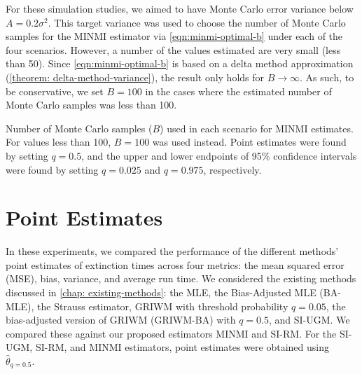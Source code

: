 For these simulation studies, we aimed to have Monte Carlo error variance below $A = 0.2\sigma^2$. This target variance was used to choose the number of Monte Carlo samples for the MINMI estimator via \autoref{eqn:minmi-optimal-b} under each of the four scenarios. However, a number of the values estimated are very small (less than 50). Since \autoref{eqn:minmi-optimal-b} is based on a delta method approximation (\autoref{theorem: delta-method-variance}), the result only holds for $B \rightarrow \infty$. As such, to be conservative, we set $B=100$ in the cases where the estimated number of Monte Carlo samples was less than 100. %
\begin{table}[ht]
    \centering
    \caption{Number of Monte Carlo samples ($B$) used in each scenario for MINMI estimates. For values less than 100, $B = 100$ was used instead. Point estimates were found by setting $q = 0.5$, and the upper and lower endpoints of 95\% confidence intervals were found by setting $q=0.025$ and $q=0.975$, respectively.}
    \vspace{4mm}
    
    \label{tab:table-sim-exp-minmi-Bs}
    \vspace{-4mm}
\end{table}

\section{Point Estimates}

In these experiments, we compared the performance of the different methods' point estimates of extinction times across four metrics: the mean squared error (MSE), bias, variance, and average run time. We considered the existing methods discussed in \autoref{chap: existing-methods}: the MLE, the Bias-Adjusted MLE (BA-MLE), the Strauss estimator, GRIWM with threshold probability $q=0.05$, the bias-adjusted version of GRIWM (GRIWM-BA) with $q=0.5$, and SI-UGM. We compared these against our proposed estimators MINMI and SI-RM. For the SI-UGM, SI-RM, and MINMI estimators, point estimates were obtained using $\hat\theta_{q=0.5}$.

